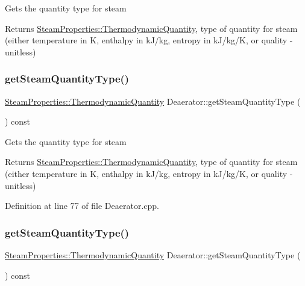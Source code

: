 Gets the quantity type for steam \begin{DoxyReturn}{Returns}
\hyperlink{class_steam_properties_ae0294bedf7d178c2d8fb6aed0f62fbff}{Steam\+Properties\+::\+Thermodynamic\+Quantity}, type of quantity for steam (either temperature in K, enthalpy in k\+J/kg, entropy in k\+J/kg/K, or quality -\/ unitless) 
\end{DoxyReturn}
\mbox{\label{class_deaerator_a18abbdc5ec78f71e1d2495b0c64c77ec}} 
\subsubsection{\texorpdfstring{get\+Steam\+Quantity\+Type()}{getSteamQuantityType()}\hspace{0.1cm}{\footnotesize\ttfamily [2/3]}}
{\footnotesize\ttfamily \hyperlink{class_steam_properties_ae0294bedf7d178c2d8fb6aed0f62fbff}{Steam\+Properties\+::\+Thermodynamic\+Quantity} Deaerator\+::get\+Steam\+Quantity\+Type (\begin{DoxyParamCaption}{ }\end{DoxyParamCaption}) const}

Gets the quantity type for steam \begin{DoxyReturn}{Returns}
\hyperlink{class_steam_properties_ae0294bedf7d178c2d8fb6aed0f62fbff}{Steam\+Properties\+::\+Thermodynamic\+Quantity}, type of quantity for steam (either temperature in K, enthalpy in k\+J/kg, entropy in k\+J/kg/K, or quality -\/ unitless) 
\end{DoxyReturn}


Definition at line 77 of file Deaerator.\+cpp.

\mbox{\label{class_deaerator_a18abbdc5ec78f71e1d2495b0c64c77ec}} 
\subsubsection{\texorpdfstring{get\+Steam\+Quantity\+Type()}{getSteamQuantityType()}\hspace{0.1cm}{\footnotesize\ttfamily [3/3]}}
{\footnotesize\ttfamily \hyperlink{class_steam_properties_ae0294bedf7d178c2d8fb6aed0f62fbff}{Steam\+Properties\+::\+Thermodynamic\+Quantity} Deaerator\+::get\+Steam\+Quantity\+Type (\begin{DoxyParamCaption}{ }\end{DoxyParamCaption}) const}

